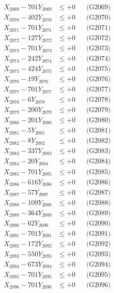 \documentclass[a4paper,10pt]{article}
\begin{document}
{\begin{align}
X_{2069} - 701Y_{2069} &\leq +0 && \text{(G2069)} \\
X_{2070} - 402Y_{2070} &\leq +0 && \text{(G2070)} \\
\allowbreak
X_{2071} - 701Y_{2071} &\leq +0 && \text{(G2071)} \\
X_{2072} - 127Y_{2072} &\leq +0 && \text{(G2072)} \\
X_{2073} - 701Y_{2073} &\leq +0 && \text{(G2073)} \\
X_{2074} - 242Y_{2074} &\leq +0 && \text{(G2074)} \\
X_{2075} - 424Y_{2075} &\leq +0 && \text{(G2075)} \\
X_{2076} - 19Y_{2076} &\leq +0 && \text{(G2076)} \\
X_{2077} - 701Y_{2077} &\leq +0 && \text{(G2077)} \\
X_{2078} - 6Y_{2078} &\leq +0 && \text{(G2078)} \\
X_{2079} - 200Y_{2079} &\leq +0 && \text{(G2079)} \\
X_{2080} - 201Y_{2080} &\leq +0 && \text{(G2080)} \\
\allowbreak
X_{2081} - 5Y_{2081} &\leq +0 && \text{(G2081)} \\
X_{2082} - 8Y_{2082} &\leq +0 && \text{(G2082)} \\
X_{2083} - 337Y_{2083} &\leq +0 && \text{(G2083)} \\
X_{2084} - 20Y_{2084} &\leq +0 && \text{(G2084)} \\
X_{2085} - 701Y_{2085} &\leq +0 && \text{(G2085)} \\
X_{2086} - 616Y_{2086} &\leq +0 && \text{(G2086)} \\
X_{2087} - 57Y_{2087} &\leq +0 && \text{(G2087)} \\
X_{2088} - 109Y_{2088} &\leq +0 && \text{(G2088)} \\
X_{2089} - 364Y_{2089} &\leq +0 && \text{(G2089)} \\
X_{2090} - 62Y_{2090} &\leq +0 && \text{(G2090)} \\
\allowbreak
X_{2091} - 701Y_{2091} &\leq +0 && \text{(G2091)} \\
X_{2092} - 172Y_{2092} &\leq +0 && \text{(G2092)} \\
X_{2093} - 550Y_{2093} &\leq +0 && \text{(G2093)} \\
X_{2094} - 673Y_{2094} &\leq +0 && \text{(G2094)} \\
X_{2095} - 701Y_{2095} &\leq +0 && \text{(G2095)} \\
X_{2096} - 701Y_{2096} &\leq +0 && \text{(G2096)} \\

\end{align}}
\end{document}

